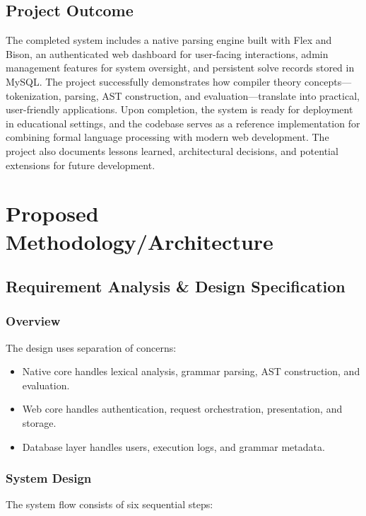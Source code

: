 \documentclass[12pt,a4paper]{report}
\begin{document}
\section{Project Outcome}

The completed system includes a native parsing engine built with Flex and Bison, an authenticated web dashboard for
user-facing interactions, admin management features for system oversight, and persistent solve records stored in MySQL.
The project successfully demonstrates how compiler theory concepts---tokenization, parsing, AST construction, and evaluation---translate
into practical, user-friendly applications. Upon completion, the system is ready for deployment in educational settings,
and the codebase serves as a reference implementation for combining formal language processing with modern web development.
The project also documents lessons learned, architectural decisions, and potential extensions for future development.

\chapter{Proposed Methodology/Architecture}

\section{Requirement Analysis \& Design Specification}

\subsection{Overview}
The design uses separation of concerns:

\begin{itemize}
\item Native core handles lexical analysis, grammar parsing, AST construction, and evaluation.
\item Web core handles authentication, request orchestration, presentation, and storage.
\item Database layer handles users, execution logs, and grammar metadata.
\end{itemize}

\subsection{System Design}

The system flow consists of six sequential steps:
\end{document}

